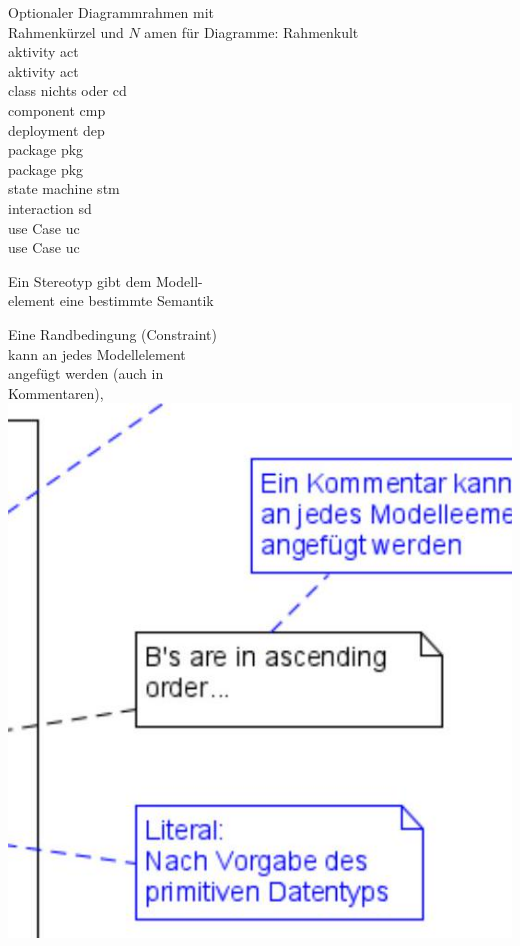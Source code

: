 \documentclass[10pt]{article}
\begin{document}
Optionaler Diagrammrahmen mit\\
Rahmenkürzel und $N$ amen für Diagramme: Rahmenkult\\
aktivity act\\
aktivity act\\
class nichts oder cd\\
component cmp\\
deployment dep\\
package pkg\\
package pkg\\
state machine stm\\
interaction sd\\
use Case uc\\
use Case uc

Ein Stereotyp gibt dem Modell-\\
element eine bestimmte Semantik

Eine Randbedingung (Constraint)\\
kann an jedes Modellelement\\
angefügt werden (auch in\\
Kommentaren),\\
\includegraphics[max width=\textwidth, center]{2025_01_02_787afb9584031d2940deg-12}
\end{document}
